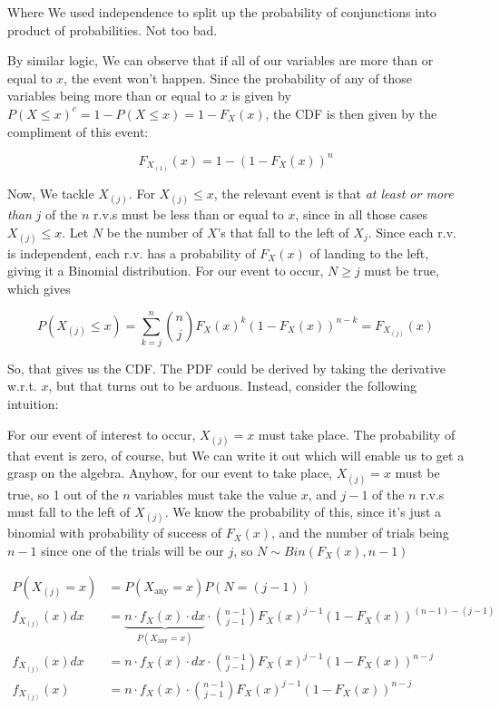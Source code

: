 \documentclass{article}
\begin{document}
		Where We used independence to split up the probability of conjunctions into product of probabilities. Not too bad.
		
		By similar logic, We can observe that if all of our variables are more than or equal to $x$, the event won't happen. Since the probability of any of those variables being more than or equal to $x$ is given by $P(X\le x)^{c} = 1-P(X\le x) = 1-F_X(x)$, the CDF is then given by the compliment of this event:
		
		\[ F_{X_{(1)}}(x) = 1- (1-F_X(x))^n \]
		
		Now, We tackle $X_{(j)}$. For $X_{(j)}\le x$, the relevant event is that \textit{at least or more than} $j$ of the $n$ r.v.s must be less than or equal to $x$, since in all those cases  $X_{(j)}\le x$. Let $N$ be the number of $X$'s that fall to the left of $X_j$. Since each r.v. is independent, each r.v. has a probability of $F_X(x)$ of landing to the left, giving it a Binomial distribution. For our event to occur, $N\ge j$ must be true, which gives
		
		\[ P(X_{(j)}\le x) = \sum^n_{k=j} {n\choose j} F_X(x)^k(1-F_X(x))^{n-k} = F_{X_{(j)}}(x) \]
		
		So, that gives  us the CDF. The PDF could be derived by taking the derivative w.r.t. $x$, but that turns out to be arduous. Instead, consider the following intuition:
		
		For our event of interest to occur, $X_{(j)} = x$ must take place. The probability of that event is zero, of course, but We can write it out which will enable us to get a grasp on the algebra. Anyhow, for our event to take place, $X_{(j)} = x$ must be true, so 1 out of the $n$ variables must take the value $x$, and $j-1$ of the $n$ r.v.s must fall to the left of $X_{(j)}$. We know the probability of this, since it's just a binomial with probability of success of $F_X(x)$, and the number of trials being $n-1$ since one of the trials will be our $j$, so $N\sim Bin(F_X(x), n-1)$
		
		\begin{align*}
		P(X_{(j)}=x) &= P(X_{\text{any}}=x)P(N=(j-1))\\
		f_{X_{(j)}}(x)dx &= \underbrace{n\cdot f_X(x)\cdot dx}_{P(X_{\text{any}}=x)}\cdot {n-1\choose j-1}F_X(x)^{j-1}(1-F_X(x))^{(n-1)-(j-1)}\\
		f_{X_{(j)}}(x)dx &= n\cdot f_X(x)\cdot dx\cdot {n-1\choose j-1}F_X(x)^{j-1}(1-F_X(x))^{n-j}\\
		f_{X_{(j)}}(x) &= n\cdot f_X(x)\cdot {n-1\choose j-1}F_X(x)^{j-1}(1-F_X(x))^{n-j}
		\end{align*}
		
\end{document}
